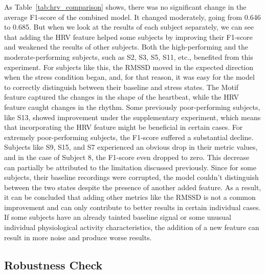 \documentclass[conference,10pt]{IEEEtran}
\begin{document}
As Table~\ref{tab:hrv_comparison} shows, there was no significant change in the average F1-score of the combined model. It changed moderately, going from 0.646 to 0.685. But when we look at the results of each subject separately, we can see that adding the HRV feature helped some subjects by improving their F1-score and weakened the results of other subjects. 
Both the high-performing and the moderate-performing subjects, such as S2, S3, S5, S11, etc., benefited from this experiment. For subjects like this, the RMSSD moved in the expected direction when the stress condition began, and, for that reason, it was easy for the model to correctly distinguish between their baseline and stress states. The Motif feature captured the changes in the shape of the heartbeat, while the HRV feature caught changes in the rhythm. 
Some previously poor-performing subjects, like S13, showed improvement under the supplementary experiment, which means that incorporating the HRV feature might be beneficial in certain cases.
For extremely poor-performing subjects, the F1-score suffered a substantial decline. Subjects like S9, S15, and S7 experienced an obvious drop in their metric values, and in the case of Subject 8, the F1-score even dropped to zero. This decrease can partially be attributed to the limitation discussed previously. Since for some subjects, their baseline recordings were corrupted, the model couldn’t distinguish between the two states despite the presence of another added feature. 
As a result, it can be concluded that adding other metrics like the RMSSD is not a common improvement and can only contribute to better results in certain individual cases. If some subjects have an already tainted baseline signal or some unusual individual physiological activity characteristics, the addition of a new feature can result in more noise and produce worse results.


\subsection{Robustness Check}
\end{document}
